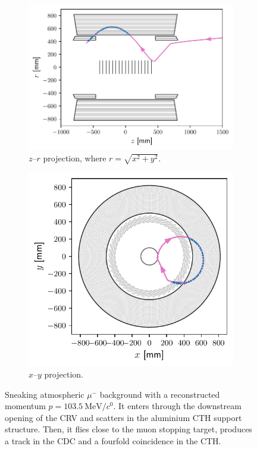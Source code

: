 \begin{figure}
    \centering
    \begin{subfigure}{0.56\textwidth}
        \centering
        \includegraphics[width=\textwidth]{chapter6/mu-_track_zy.pdf}
        \caption{$z$--$r$ projection, where $r = \sqrt{x^2+y^2}$.}
    \end{subfigure}
    \hfill
    \begin{subfigure}{0.43\textwidth}
        \centering
        \includegraphics[width=\textwidth]{chapter6/mu-_track_xy.pdf}
        \caption{$x$--$y$ projection.}
    \end{subfigure}
    \caption{ Sneaking atmospheric $\mu^-$ background with a reconstructed
        momentum $p=\SI{103.5}{\MeV/\clight}$. It enters through the downstream
        opening of the CRV and scatters in the aluminium CTH support structure.
        Then, it flies close to the muon stopping target, produces a track in
        the CDC and a fourfold coincidence in the CTH. }
    \label{fig:cosmic_muon_bg_in_cydet}
\end{figure}


